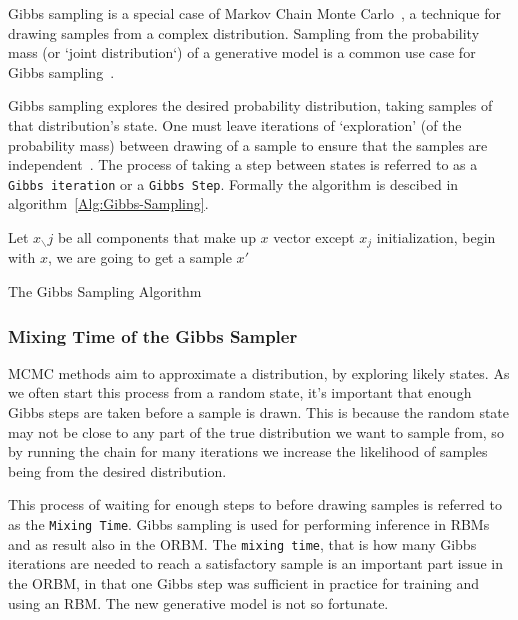 Gibbs sampling is a special case of Markov Chain Monte Carlo~\cite{hastings70}, a technique for drawing samples from a complex distribution. Sampling from the probability mass (or `joint distribution`) of a generative model is a common use case for Gibbs sampling~\cite{Pearl:1988:PRI:52121}.

Gibbs sampling explores the desired probability distribution, taking samples of that distribution's state. One must leave iterations of `exploration' (of the probability mass) between drawing of a sample to ensure that the samples are independent~\cite{casella1992explaining}. The process of taking a step between states is referred to as a \texttt{Gibbs iteration} or a \texttt{Gibbs Step}. Formally the algorithm is descibed in algorithm~\ref{Alg:Gibbs-Sampling}.

\begin{algorithm}[!ht]
 Let $ x_{\smallsetminus} j$ be all components that make up $x$ vector except $x_j$\;
 initialization, begin with $x$, we are going to get a sample $x'$\;
 \caption{The Gibbs Sampling Algorithm}\label{Alg:Gibbs-Sampling}
\end{algorithm}

\subsubsection{Mixing Time of the Gibbs Sampler}

MCMC methods aim to approximate a distribution, by exploring likely states. As we often start this process from a random state, it's important that enough Gibbs steps are taken before a sample is drawn. This is because the random state may not be close to any part of the true distribution we want to sample from, so by running the chain for many iterations we increase the likelihood of samples being from the desired distribution.

This process of waiting for enough steps to before drawing samples is referred to as the \texttt{Mixing Time}. Gibbs sampling is used for performing inference in RBMs~\cite{Hinton:2006:FLA:1161603.1161605} and as result also in the ORBM. The \texttt{mixing time}, that is how many Gibbs iterations are needed to reach a satisfactory sample is an important part issue in the ORBM, in that one Gibbs step was sufficient in practice for training and using an RBM. The new generative model is not so fortunate.

